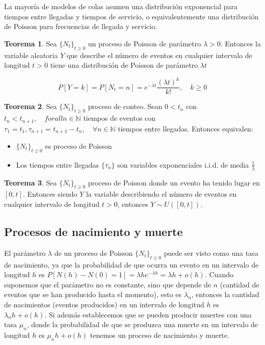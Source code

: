 \documentclass[a4paper,10pt]{scrartcl}
\theoremstyle{definition}
\newtheorem*{theorem}{Teorema}
\numberwithin{equation}{section}
\begin{document}
La mayoría de modelos de colas asumen una distribución exponencial para tiempos entre llegadas y tiempos 
de servicio, o equivalentemente una distribución de Poisson para frecuencias de llegada y servicio.

\begin{theorem}
 Sea $\{N_t\}_{t\ge 0}$ un proceso de Poisson de parámetro $\lambda > 0$. Entonces la variable aleatoria $Y$ que
 describe el número de eventos en cualquier intervalo de longitud $t > 0$ tiene una distribución de Poisson de parámetro
 $\lambda t$
 
 \[P[Y = k] = P[N_t = n] = e^{-\lambda t} \frac{(\lambda t)^k}{k!}, \quad k\ge 0\]
 
\end{theorem}


\begin{theorem}
 Sea $\{N_t\}_{t\ge 0}$ proceso de conteo. Sean $0 < t_n$ con $t_{n} < t_{n+1}, \quad forall n\in 
 \mathbb{N}$ tiempos de eventos con $\tau_1= t_1, \tau_{n+1} = t_{n+1} - t_{n}, \quad \forall n\in
 \mathbb{N}$ tiempos entre llegadas. Entonces equivalen:
 
 \begin{itemize}
  \item $\{N_t\}_{t\ge 0}$ es proceso de Poisson
  \item Los tiempos entre llegadas $\{\tau_n\}$ son variables exponenciales i.i.d. de media $\frac{1}{\lambda}$
 \end{itemize}

\end{theorem}


\begin{theorem}
 Sea $\{N_t\}_{t\ge 0}$ proceso de Poisson donde un evento ha tenido lugar en $[0,t]$. Entonces siendo $Y$ la variable
 describiendo el número de eventos en cualquier intervalo de longitud $t > 0$, entonces $Y \sim U([0,t])$.
\end{theorem}


\subsection{Procesos de nacimiento y muerte}

El parámetro $\lambda$ de un proceso de Poisson $\{N_t\}_{t\ge 0}$ puede ser visto como una tasa de nacimiento, ya que la probabilidad
de que ocurra un evento en un intervalo de longitud $h$ es $P[N(h)-N(0)=1] = \lambda h e^{-\lambda h} = \lambda h + o(h)$.
Cuando suponemos que el parámetro no es constante, sino que depende de $n$ (cantidad de eventos que se han producido hasta el momento), esto
es $\lambda_n$, entonces la cantidad de nacimientos (eventos producidos) en un intervalo de longitud $h$ es $\lambda_n h + o(h)$. Si además
establecemos que se pueden producir muertes con una tasa $\mu_n$, donde la probabilidad de que se produzca una muerte en un intervalo de longitud
$h$ es $\mu_n h + o(h)$ tenemos un proceso de nacimiento y muerte.
\end{document}
